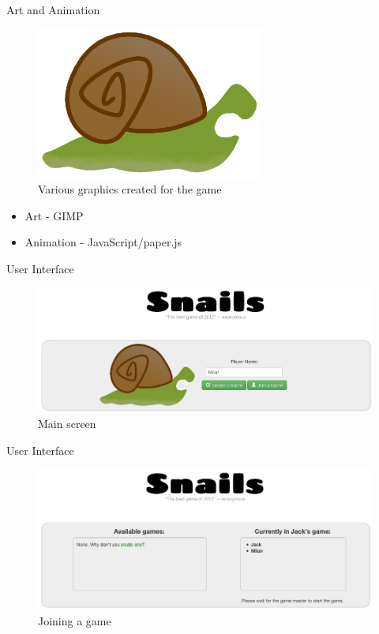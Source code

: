 \documentclass{beamer}
\begin{document}
\begin{frame}{Art and Animation}
\begin{figure}
    \includegraphics[scale=0.15]{../game/static/img/snail_teeth.png}
    \caption{Various graphics created for the game}
  \end{figure}
  \begin{itemize}
    \item Art - GIMP
    \item Animation - JavaScript/paper.js
  \end{itemize}
\end{frame}

\begin{frame}{User Interface}
  \begin{figure}[hb]
    \centering
    \includegraphics[scale=0.3]{index.jpg}
    \caption{Main screen}
  \end{figure}
\end{frame}

\begin{frame}{User Interface}
  \begin{figure}[hb]
    \centering
    \includegraphics[scale=0.3]{join.jpg}
    \caption{Joining a game}
  \end{figure}
\end{frame}
\end{document}
